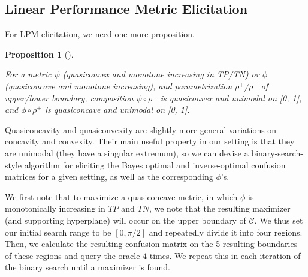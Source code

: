\documentclass[
  letterpaper,
  numbers=noenddot,
  DIV=11]{scrreprt}
\theoremstyle{definition}
\theoremstyle{plain}
\newtheorem{proposition}{Proposition}[chapter]
\theoremstyle{plain}
\theoremstyle{remark}
\begin{document}
\subsection{Linear Performance Metric Elicitation}\label{sec-orgb6dac4e}

For LPM elicitation, we need one more proposition.

\begin{tcolorbox}[colframe=.grey, title=\faPenSquare \enspace Proposition]

\begin{proposition}[]\protect\hypertarget{prp-prp3.2}{}\label{prp-prp3.2}

For a metric \(\psi\) (quasiconvex and monotone increasing in TP/TN) or
\(\phi\) (quasiconcave and monotone increasing), and parametrization
\(\rho^+\)/\(\rho^-\) of upper/lower boundary, composition
\(\psi \circ \rho^-\) is quasiconvex and unimodal on {[}0, 1{]}, and
\(\phi \circ \rho^+\) is quasiconcave and unimodal on {[}0, 1{]}.

\end{proposition}

\end{tcolorbox}

Quasiconcavity and quasiconvexity are slightly more general variations
on concavity and convexity. Their main useful property in our setting is
that they are unimodal (they have a singular extremum), so we can devise
a binary-search-style algorithm for eliciting the Bayes optimal and
inverse-optimal confusion matrices for a given setting, as well as the
corresponding \(\phi\)'s.

We first note that to maximize a quasiconcave metric, in which \(\phi\)
is monotonically increasing in \(TP\) and \(TN\), we note that the
resulting maximizer (and supporting hyperplane) will occur on the upper
boundary of \(\mathcal{C}\). We thus set our initial search range to be
\([0, \pi/2]\) and repeatedly divide it into four regions. Then, we
calculate the resulting confusion matrix on the 5 resulting boundaries
of these regions and query the oracle \(4\) times. We repeat this in
each iteration of the binary search until a maximizer is found.
\end{document}
